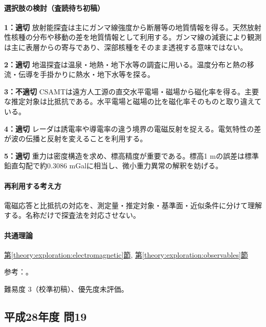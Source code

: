 \paragraph{選択肢の検討（査読待ち初稿）}\mbox{}\par

\noindent\textbf{1：適切} 放射能探査は主にガンマ線強度から断層等の地質情報を得る。天然放射性核種の分布や移動の差を地質情報として利用する。ガンマ線の減衰により観測は主に表層からの寄与であり、深部核種をそのまま透視する意味ではない。\par

\noindent\textbf{2：適切} 地温探査は温泉・地熱・地下水等の調査に用いる。温度分布と熱の移流・伝導を手掛かりに熱水・地下水等を探る。\par

\noindent\textbf{3：不適切} CSAMTは遠方人工源の直交水平電場・磁場から磁化率を得る。主要な推定対象は比抵抗である。水平電場と磁場の比を磁化率そのものと取り違えている。\par

\noindent\textbf{4：適切} レーダは誘電率や導電率の違う境界の電磁反射を捉える。電気特性の差が波の伝播と反射を変えることを利用する。\par

\noindent\textbf{5：適切} 重力は密度構造を求め、標高精度が重要である。標高1 mの誤差は標準鉛直勾配で約0.3086 mGalに相当し、微小重力異常の解釈を妨げる。\par

\paragraph{再利用する考え方} 電磁応答と比抵抗の対応を、測定量・推定対象・基準面・近似条件に分けて理解する。名称だけで探査法を対応させない。

\paragraph{共通理論} \hyperref[theory:exploration:electromagnetic]{第\ref*{theory:exploration:electromagnetic}節}, \hyperref[theory:exploration:observables]{第\ref*{theory:exploration:observables}節}

\par 参考：\cite{ochi_csamt_saijo,gsi_gravity_definitions}。

\par 難易度 3（校準初稿）、優先度未評価。

\subsection{平成28年度 問19}
\label{q:h28-reg-applied-19}

